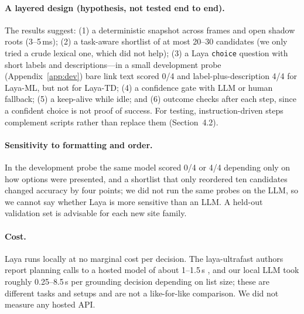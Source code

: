 \documentclass[11pt,a4paper]{article}
\begin{document}
\paragraph{A layered design (hypothesis, not tested end to end).} The results suggest: (1) a deterministic snapshot across frames and open shadow roots (3--5\,ms); (2) a task-aware shortlist of at most 20--30 candidates (we only tried a crude lexical one, which did not help); (3) a Laya \texttt{choice} question with short labels and descriptions---in a small development probe (Appendix~\ref{app:dev}) bare link text scored 0/4 and label-plus-description 4/4 for Laya-ML, but not for Laya-TD; (4) a confidence gate with LLM or human fallback; (5) a keep-alive while idle; and (6) outcome checks after each step, since a confident choice is not proof of success. For testing, instruction-driven steps complement scripts rather than replace them (Section~4.2).

\paragraph{Sensitivity to formatting and order.} In the development probe the same model scored 0/4 or 4/4 depending only on how options were presented, and a shortlist that only reordered ten candidates changed accuracy by four points; we did not run the same probes on the LLM, so we cannot say whether Laya is more sensitive than an LLM. A held-out validation set is advisable for each new site family.

\paragraph{Cost.} Laya runs locally at no marginal cost per decision. The laya-ultrafast authors report planning calls to a hosted model of about 1--1.5\,s \cite{layaultrafast}, and our local LLM took roughly 0.25--8.5\,s per grounding decision depending on list size; these are different tasks and setups and are not a like-for-like comparison. We did not measure any hosted API.
\end{document}
